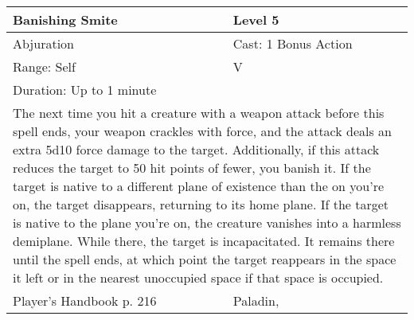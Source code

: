 \documentclass[11pt]{report}
\begin{document}
\begin{table}[H]
	\begin{tabular}{||p{6cm}|p{6cm}||}
		\hline\hline
		\bf{Banishing Smite} & Level 5\\ \hline
		Abjuration & Cast: 1 Bonus Action\\ \hline
		Range: Self & V\\ \hline
		Duration: Up to 1 minute & \\ \hline
		\multicolumn{2}{||p{12cm}||}{The next time you hit a creature with a weapon attack before this spell ends, your weapon crackles with force, and the attack deals an extra 5d10 force damage to the target. Additionally, if this attack reduces the target to 50 hit points of fewer, you banish it. If the target is native to a different plane of existence than the on you’re on, the target disappears, returning to its home plane. If the target is native to the plane you’re on, the creature vanishes into a harmless demiplane. While there, the target is incapacitated. It remains there until the spell ends, at which point the target reappears in the space it left or in the nearest unoccupied space if that space is occupied.}\\ \hline
Player's Handbook p. 216 & Paladin, \\ \hline\hline
	\end{tabular}
\end{table}
\end{document}
